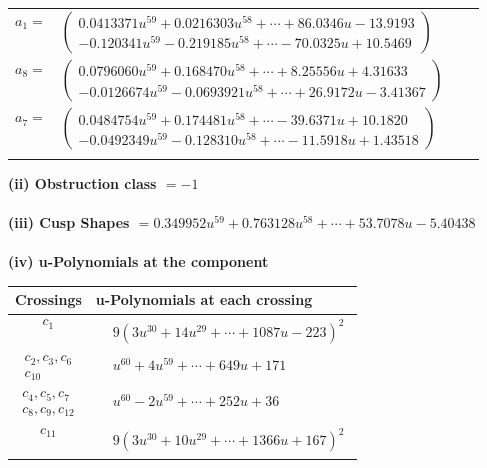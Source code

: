 \documentclass[1p]{elsarticle_modified}
\theoremstyle{definition}
\begin{document}
\begin{tabular}{m{7pt} m{180pt} m{7pt} m{180pt} }
\flushright $a_{1}=$&$\begin{pmatrix}0.0413371 u^{59}+0.0216303 u^{58}+\cdots+86.0346 u-13.9193\\-0.120341 u^{59}-0.219185 u^{58}+\cdots-70.0325 u+10.5469\end{pmatrix}$ \\
\flushright $a_{8}=$&$\begin{pmatrix}0.0796060 u^{59}+0.168470 u^{58}+\cdots+8.25556 u+4.31633\\-0.0126674 u^{59}-0.0693921 u^{58}+\cdots+26.9172 u-3.41367\end{pmatrix}$ \\
\flushright $a_{7}=$&$\begin{pmatrix}0.0484754 u^{59}+0.174481 u^{58}+\cdots-39.6371 u+10.1820\\-0.0492349 u^{59}-0.128310 u^{58}+\cdots-11.5918 u+1.43518\end{pmatrix}$\\&\end{tabular}
\flushleft \textbf{(ii) Obstruction class $= -1$}\\~\\
\flushleft \textbf{(iii) Cusp Shapes $= 0.349952 u^{59}+0.763128 u^{58}+\cdots+53.7078 u-5.40438$}\\~\\
\newpage\renewcommand{\arraystretch}{1}
\flushleft \textbf{(iv) u-Polynomials at the component}\newline \\
\begin{tabular}{m{50pt}|m{274pt}}
Crossings & \hspace{64pt}u-Polynomials at each crossing \\
\hline $$\begin{aligned}c_{1}\end{aligned}$$&$\begin{aligned}
&9(3 u^{30}+14 u^{29}+\cdots+1087 u-223)^{2}
\end{aligned}$\\
\hline $$\begin{aligned}c_{2},c_{3},c_{6}\\c_{10}\end{aligned}$$&$\begin{aligned}
&u^{60}+4 u^{59}+\cdots+649 u+171
\end{aligned}$\\
\hline $$\begin{aligned}c_{4},c_{5},c_{7}\\c_{8},c_{9},c_{12}\end{aligned}$$&$\begin{aligned}
&u^{60}-2 u^{59}+\cdots+252 u+36
\end{aligned}$\\
\hline $$\begin{aligned}c_{11}\end{aligned}$$&$\begin{aligned}
&9(3 u^{30}+10 u^{29}+\cdots+1366 u+167)^{2}
\end{aligned}$\\
\hline
\end{tabular}\\~\\
\end{document}
